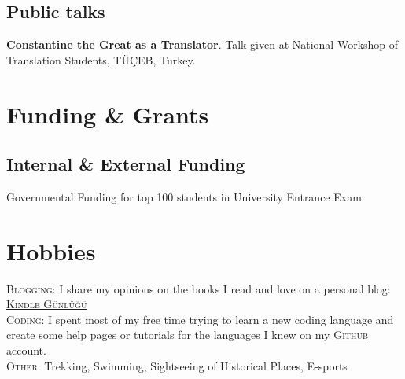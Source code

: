 \documentclass[11.5pt, a4paper]{article}
\newcommand{\years}[1]{\marginnote{\scriptsize #1}}
\begin{document}


\subsection*{Public talks}
\noindent
\years{2016}\textbf{Constantine the Great as a Translator}. Talk given at National Workshop of Translation Students, TÜÇEB, Turkey. \\


\section*{\faMoney \thinspace Funding \& Grants}

\subsection*{Internal \& External Funding}
\noindent
\years{2012-2017}Governmental Funding for top 100 students in University Entrance Exam





\section*{\faPuzzlePiece \thinspace Hobbies}
\textsc{Blogging}: I share my opinions on the books I read and love on a personal blog: \href{https://kindlegunlugu.blogspot.com.tr/}{\textsc{Kindle Günlüğü}} \\
\textsc{Coding}: I spent most of my free time trying to learn a new coding language and create some help pages or tutorials for the languages I knew on my \href{https://github.com/utkuturk}{\textsc{Github}} account. \\
\textsc{Other}: Trekking, Swimming, Sightseeing of Historical Places, E-sports \\
\end{document}
